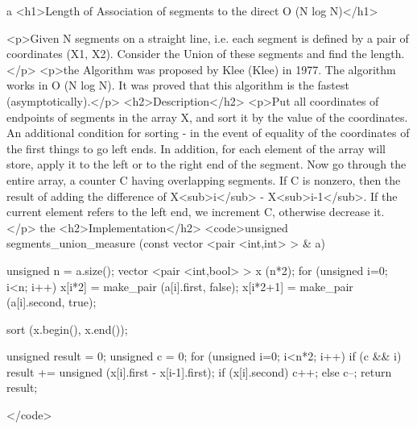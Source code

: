 a <h1>Length of Association of segments to the direct O (N log N)</h1>

<p>Given N segments on a straight line, i.e. each segment is defined by a pair of coordinates (X1, X2). Consider the Union of these segments and find the length.</p>
<p>the Algorithm was proposed by Klee (Klee) in 1977. The algorithm works in O (N log N). It was proved that this algorithm is the fastest (asymptotically).</p>
<h2>Description</h2>
<p>Put all coordinates of endpoints of segments in the array X, and sort it by the value of the coordinates. An additional condition for sorting - in the event of equality of the coordinates of the first things to go left ends. In addition, for each element of the array will store, apply it to the left or to the right end of the segment. Now go through the entire array, a counter C having overlapping segments. If C is nonzero, then the result of adding the difference of X<sub>i</sub> - X<sub>i-1</sub>. If the current element refers to the left end, we increment C, otherwise decrease it.</p>
the <h2>Implementation</h2>
<code>unsigned segments_union_measure (const vector <pair <int,int> > & a)
{
unsigned n = a.size();
vector <pair <int,bool> > x (n*2);
for (unsigned i=0; i<n; i++)
{
x[i*2] = make_pair (a[i].first, false);
x[i*2+1] = make_pair (a[i].second, true);
}

sort (x.begin(), x.end());

unsigned result = 0;
unsigned c = 0;
for (unsigned i=0; i<n*2; i++)
{
if (c && i)
result += unsigned (x[i].first - x[i-1].first);
if (x[i].second)
c++;
else
c--;
}
return result;
}</code>
